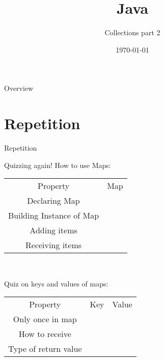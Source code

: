 


\usepackage{qtree}

\title{Java}
\subtitle{Collections part 2}
\date{\today}

\usepackage{color}


\begin{frame}
\titlepage
\end{frame}

\begin{frame}{Overview}
\tableofcontents
\end{frame}

\section{Repetition}

\begin{frame}{}
	\huge Repetition
\end{frame}

\begin{frame}{Quizzing again!}
	How to use Maps:\\
	\begin{tabular}{c|c}
		Property&Map\\
		Declaring Map&\\
		Building Instance of Map&\\
		Adding items&\\
		Receiving items&\\
	\end{tabular}\\
	\vspace{1cm}
	
	Quiz on keys and values of maps:\\
	\vspace{0.5cm}
	\begin{tabular}{c|c|c}
		Property&Key&Value\\
		Only once in map&&\\
		How to receive&&\\
		Type of return value&&\\
	\end{tabular}
\end{frame}

